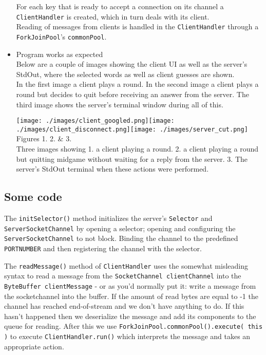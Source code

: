 \documentclass[a4paper]{scrartcl}
\begin{document}
\begin{itemize}
{		For each key that is ready to accept a connection on its channel a \texttt{ClientHandler} is created, which in turn deals with its client.\\
		Reading of messages from clients is handled in the \texttt{ClientHandler} through a \texttt{ForkJoinPool}'s \texttt{commonPool}.
	}
	\item{
		Program works as expected\\
		Below are a couple of images showing the client UI as well as the server's StdOut, where the selected words as well as client guesses are shown.\\
		In the first image a client plays a round. In the second image a client plays a round but decides to quit before receiving an answer from the server. The third image shows the server's terminal window during all of this.
		\begin{center}
			\texttt{[image: ./images/client\_googled.png]}\quad\texttt{[image: ./images/client\_disconnect.png]}\quad\texttt{[image: ./images/server\_cut.png]}
			\footnotesize{
				Figures 1. 2. \& 3.\\Three images showing 1. a client playing a round. 2. a client playing a round but quitting midgame without waiting for a reply from the server. 3. The server's StdOut terminal when these actions were performed.
			}
		\end{center}
	}
\end{itemize}

\subsection{Some code}

The \texttt{initSelector()} method initializes the server's \texttt{Selector} and \texttt{ServerSocketChannel} by opening a selector; opening and configuring the \texttt{ServerSocketChannel} to not block. Binding the channel to the predefined \texttt{PORTNUMBER} and then registering the channel with the selector.


The \texttt{readMessage()} method of \texttt{ClientHandler} uses the somewhat misleading syntax to read a message from the \texttt{SocketChannel clientChannel} into the \texttt{ByteBuffer clientMessage} - or as you'd normally put it: write a message from the socketchannel into the buffer. If the amount of read bytes are equal to -1 the channel has reached end-of-stream and we don't have anything to do.
If this hasn't happened then we deserialize the message and add its components to the queue for reading. After this we use \texttt{ForkJoinPool.commonPool().execute( this )} to execute \texttt{ClientHandler.run()} which interprets the message and takes an appropriate action. 

\end{document}
